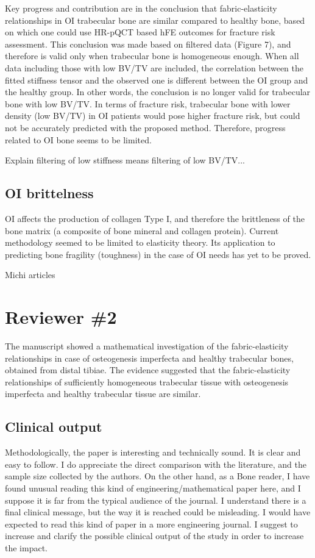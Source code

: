 \documentclass{AR2RC}
\begin{document}
\RC Key progress and contribution are in the conclusion that fabric-elasticity relationships in OI trabecular bone are similar compared to healthy bone, based on which one could use HR-pQCT based hFE outcomes for fracture risk assessment. This conclusion was made based on filtered data (Figure 7), and therefore is valid only when trabecular bone is homogeneous enough. When all data including those with low BV/TV are included, the correlation between the fitted stiffness tensor and the observed one is different between the OI group and the healthy group. In other words, the conclusion is no longer valid for trabecular bone with low BV/TV. In terms of fracture risk, trabecular bone with lower density (low BV/TV) in OI patients would pose higher fracture risk, but could not be accurately predicted with the proposed method. Therefore, progress related to OI bone seems to be limited.

\AR Explain filtering of low stiffness means filtering of low BV/TV...

\subsection{OI brittelness}

\RC OI affects the production of collagen Type I, and therefore the brittleness of the bone matrix (a composite of bone mineral and collagen protein). Current methodology seemed to be limited to elasticity theory. Its application to predicting bone fragility (toughness) in the case of OI needs has yet to be proved.

\AR Michi articles



\section{Reviewer \#2}

\RC The manuscript showed a mathematical investigation of the fabric-elasticity relationships in case of osteogenesis imperfecta and healthy trabecular bones, obtained from distal tibiae. The evidence suggested that the fabric-elasticity relationships of sufficiently homogeneous trabecular tissue with osteogenesis imperfecta and healthy trabecular tissue are similar.

\subsection{Clinical output}

\RC Methodologically, the paper is interesting and technically sound. It is clear and easy to follow. I do appreciate the direct comparison with the literature, and the sample size collected by the authors. On the other hand, as a Bone reader, I have found unusual reading this kind of engineering/mathematical paper here, and I suppose it is far from the typical audience of the journal. I understand there is a final clinical message, but the way it is reached could be misleading. I would have expected to read this kind of paper in a more engineering journal. I suggest to increase and clarify the possible clinical output of the study in order to increase the impact.
\end{document}
